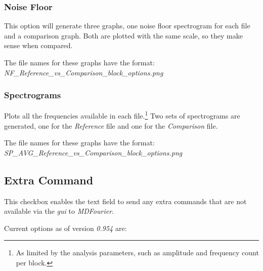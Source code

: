 \documentclass[10pt,a4paper]{report}
\newcommand{\ac}[1]{\textit{\mbox{\acrshort{#1}}}}
\begin{document}
\begin{appendices}
\subsubsection{Noise Floor}

This option will generate three graphs, one noise floor spectrogram for each file and a comparison graph. Both are plotted with the same scale, so they make sense when compared. 

The file names for these graphs have the format:\\ \textit{NF\_Reference\_vs\_Comparison\_block\_options.png}

\subsubsection{Spectrograms}

Plots all the frequencies available in each file.\footnote{As limited by the analysis parameters, such as amplitude and frequency count per block.} Two sets of spectrograms are generated, one for the \textit{Reference} file and one for the \textit{Comparison} file.

The file names for these graphs have the format:\\ \textit{SP\_AVG\_Reference\_vs\_Comparison\_block\_options.png}

\subsection{Extra Command}
\label{extracommand}

This checkbox enables the text field to send any extra commands that are not available via the \ac{gui} to \textit{MDFourier}. 

Current options as of version \textit{0.954} are:


\end{appendices}
\end{document}
